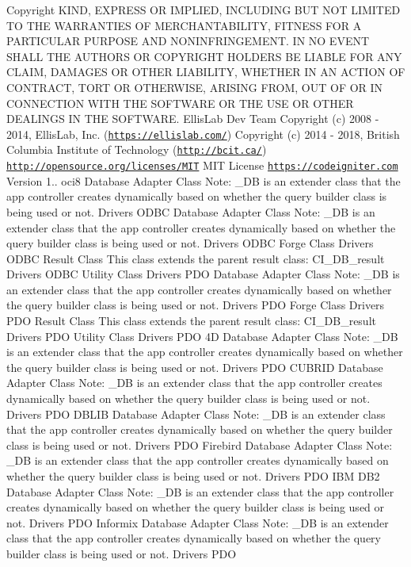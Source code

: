 \begin{DoxyCopyright}{Copyright}
K\+I\+ND, E\+X\+P\+R\+E\+SS OR I\+M\+P\+L\+I\+ED, I\+N\+C\+L\+U\+D\+I\+NG B\+UT N\+OT L\+I\+M\+I\+T\+ED TO T\+HE W\+A\+R\+R\+A\+N\+T\+I\+ES OF M\+E\+R\+C\+H\+A\+N\+T\+A\+B\+I\+L\+I\+TY, F\+I\+T\+N\+E\+SS F\+OR A P\+A\+R\+T\+I\+C\+U\+L\+AR P\+U\+R\+P\+O\+SE A\+ND N\+O\+N\+I\+N\+F\+R\+I\+N\+G\+E\+M\+E\+NT. IN NO E\+V\+E\+NT S\+H\+A\+LL T\+HE A\+U\+T\+H\+O\+RS OR C\+O\+P\+Y\+R\+I\+G\+HT H\+O\+L\+D\+E\+RS BE L\+I\+A\+B\+LE F\+OR A\+NY C\+L\+A\+IM, D\+A\+M\+A\+G\+ES OR O\+T\+H\+ER L\+I\+A\+B\+I\+L\+I\+TY, W\+H\+E\+T\+H\+ER IN AN A\+C\+T\+I\+ON OF C\+O\+N\+T\+R\+A\+CT, T\+O\+RT OR O\+T\+H\+E\+R\+W\+I\+SE, A\+R\+I\+S\+I\+NG F\+R\+OM, O\+UT OF OR IN C\+O\+N\+N\+E\+C\+T\+I\+ON W\+I\+TH T\+HE S\+O\+F\+T\+W\+A\+RE OR T\+HE U\+SE OR O\+T\+H\+ER D\+E\+A\+L\+I\+N\+GS IN T\+HE S\+O\+F\+T\+W\+A\+RE.  Ellis\+Lab Dev Team  Copyright (c) 2008 -\/ 2014, Ellis\+Lab, Inc. (\href{https://ellislab.com/}{\tt https\+://ellislab.\+com/})  Copyright (c) 2014 -\/ 2018, British Columbia Institute of Technology (\href{http://bcit.ca/}{\tt http\+://bcit.\+ca/})  \href{http://opensource.org/licenses/MIT}{\tt http\+://opensource.\+org/licenses/\+M\+IT} M\+IT License  \href{https://codeigniter.com}{\tt https\+://codeigniter.\+com}  Version 1..  oci8 Database Adapter Class Note\+: \+\_\+\+DB is an extender class that the app controller creates dynamically based on whether the query builder class is being used or not.  Drivers O\+D\+BC Database Adapter Class Note\+: \+\_\+\+DB is an extender class that the app controller creates dynamically based on whether the query builder class is being used or not.  Drivers O\+D\+BC Forge Class  Drivers O\+D\+BC Result Class This class extends the parent result class\+: C\+I\+\_\+\+D\+B\+\_\+result  Drivers O\+D\+BC Utility Class  Drivers P\+DO Database Adapter Class Note\+: \+\_\+\+DB is an extender class that the app controller creates dynamically based on whether the query builder class is being used or not.  Drivers P\+DO Forge Class  Drivers P\+DO Result Class This class extends the parent result class\+: C\+I\+\_\+\+D\+B\+\_\+result  Drivers P\+DO Utility Class  Drivers P\+DO 4D Database Adapter Class Note\+: \+\_\+\+DB is an extender class that the app controller creates dynamically based on whether the query builder class is being used or not.  Drivers P\+DO C\+U\+B\+R\+ID Database Adapter Class Note\+: \+\_\+\+DB is an extender class that the app controller creates dynamically based on whether the query builder class is being used or not.  Drivers P\+DO D\+B\+L\+IB Database Adapter Class Note\+: \+\_\+\+DB is an extender class that the app controller creates dynamically based on whether the query builder class is being used or not.  Drivers P\+DO Firebird Database Adapter Class Note\+: \+\_\+\+DB is an extender class that the app controller creates dynamically based on whether the query builder class is being used or not.  Drivers P\+DO I\+BM D\+B2 Database Adapter Class Note\+: \+\_\+\+DB is an extender class that the app controller creates dynamically based on whether the query builder class is being used or not.  Drivers P\+DO Informix Database Adapter Class Note\+: \+\_\+\+DB is an extender class that the app controller creates dynamically based on whether the query builder class is being used or not.  Drivers P\+DO 
\end{DoxyCopyright}
